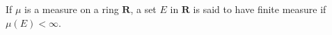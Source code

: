 If $\mu$ is a measure on a ring $\mathbf{R}$, a set $E$ in $\mathbf{R}$ is said to have finite measure if $\mu(E) < \infty$.

